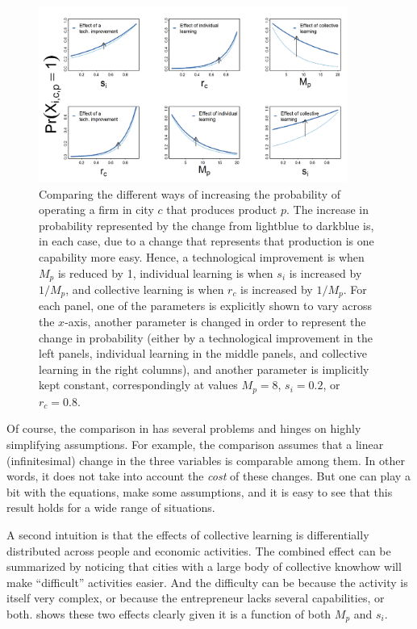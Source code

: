 \documentclass[12pt]{article}
\begin{document}
\begin{figure}[!th]
	\begin{center}
		\includegraphics[width=0.9\textwidth]{Fig_Model_param_comparison.png}
		\caption{Comparing the different ways of increasing the probability of operating a firm in city $c$ that produces product $p$. The increase in probability represented by the change from lightblue to darkblue is, in each case, due to a change that represents that production is one capability more easy. Hence, a technological improvement is when $M_p$ is reduced by 1, individual learning is when $s_i$ is increased by $1/M_p$, and collective learning is when $r_c$ is increased by $1/M_p$. For each panel, one of the parameters is explicitly shown to vary across the $x$-axis, another parameter is changed in order to represent the change in probability (either by a technological improvement in the left panels, individual learning in the middle panels, and collective learning in the right columns), and another parameter is implicitly kept constant, correspondingly at values $M_p=8$, $s_i=0.2$, or $r_c=0.8$.}
	\label{fig_model_learning}
	\end{center}
\end{figure}


Of course, the comparison in  has several problems and hinges on highly simplifying assumptions. For example, the comparison assumes that a linear (infinitesimal) change in the three variables is comparable among them. In other words, it does not take into account the \emph{cost} of these changes. But one can play a bit with the equations, make some assumptions, and it is easy to see that this result holds for a wide range of situations.

A second intuition is that the effects of collective learning is differentially distributed across people and economic activities. The combined effect can be summarized by noticing that cities with a large body of collective knowhow will make ``difficult'' activities easier. And the difficulty can be because the activity is itself very complex, or because the entrepreneur lacks several capabilities, or both.  shows these two effects clearly given it is a function of both $M_p$ and $s_i$. 
\end{document}
